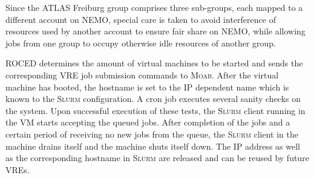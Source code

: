 Since the ATLAS Freiburg group comprises three sub-groups, each mapped
to a different account on NE\-MO, special care is taken to
avoid interference of resources used by another account to ensure fair share on NEMO, while
allowing jobs from one group to occupy otherwise idle resources of another group.

ROCED determines the amount of virtual machines to be started and sends the
corresponding VRE job submission commands to \textsc{Moab}.
After the virtual machine has booted, the hostname is set to the IP
dependent name which is known to the \textsc{Slurm} configuration.
A cron job executes several sanity
checks on the system.
Upon successful execution of these tests, the \textsc{Slurm} client
running in the VM starts accepting the queued jobs.
After completion of the jobs and a certain period of receiving no new jobs from the queue, the
\textsc{Slurm} client in the machine drains itself and the machine
shuts itself down.
The IP address as well as the corresponding hostname in \textsc{Slurm}
are released and can be reused by future VREs.
